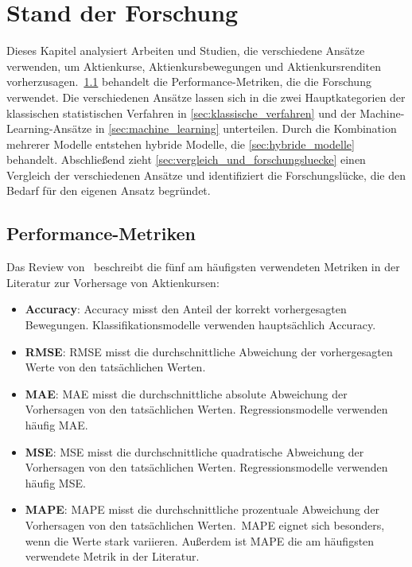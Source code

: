 \chapter{Stand der Forschung}\label{chap:stand_der_forschung}
Dieses Kapitel analysiert Arbeiten und Studien, die verschiedene Ansätze verwenden, um Aktienkurse, Aktienkursbewegungen und Aktienkursrenditen vorherzusagen.~\cref{sec:performance_metriken} behandelt die Performance-Metriken, die die Forschung verwendet. Die verschiedenen Ansätze lassen sich in die zwei Hauptkategorien der klassischen statistischen Verfahren in \cref{sec:klassische_verfahren} und der Machine-Learning-Ansätze in \cref{sec:machine_learning} unterteilen. Durch die Kombination mehrerer Modelle entstehen hybride Modelle, die \cref{sec:hybride_modelle} behandelt. Abschließend zieht \cref{sec:vergleich_und_forschungsluecke} einen Vergleich der verschiedenen Ansätze und identifiziert die Forschungslücke, die den Bedarf für den eigenen Ansatz begründet.

\section{Performance-Metriken}\label{sec:performance_metriken}
Das Review von~\textcite{kumar2022systematic} beschreibt die fünf am häufigsten verwendeten Metriken in der Literatur zur Vorhersage von Aktienkursen:
\begin{itemize}
    \item \textbf{Accuracy}: Accuracy misst den Anteil der korrekt vorhergesagten Bewegungen. Klassifikationsmodelle verwenden hauptsächlich Accuracy.
    \item \textbf{\acf{RMSE}}: \ac{RMSE} misst die durchschnittliche Abweichung der vorhergesagten Werte von den tatsächlichen Werten.
    \item \textbf{\acf{MAE}}: \ac{MAE} misst die durchschnittliche absolute Abweichung der Vorhersagen von den tatsächlichen Werten. Regressionsmodelle verwenden häufig \ac{MAE}.
    \item \textbf{\acf{MSE}}: \ac{MSE} misst die durchschnittliche quadratische Abweichung der Vorhersagen von den tatsächlichen Werten. Regressionsmodelle verwenden häufig \ac{MSE}.
    \item \textbf{\acf{MAPE}}: \ac{MAPE} misst die durchschnittliche prozentuale Abweichung der Vorhersagen von den tatsächlichen Werten.~\ac{MAPE} eignet sich besonders, wenn die Werte stark variieren. Außerdem ist \ac{MAPE} die am häufigsten verwendete Metrik in der Literatur.
\end{itemize}


